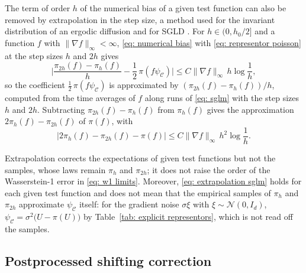\documentclass{article}
\newcommand{\Le}{\leqslant}
\newcommand{\norm}[1]{\lVert #1 \rVert}
\numberwithin{equation}{section}
\begin{document}
The term of order $h$ of the numerical bias of a given test function can also be removed by extrapolation in the step size, a method used for the invariant distribution of an ergodic diffusion \citep{lemaire2015invariant} and for SGLD \citep{durmus2016stochastic}. For $h \in (0, h_0/2]$ and a function $f$ with $\norm{\nabla f}_\infty < \infty$, \eqref{eq: numerical bias} with \eqref{eq: representor poisson} at the step sizes $h$ and $2h$ gives
\begin{equation}
    \biggl| \frac{\pi_{2h}(f) - \pi_h(f)}{h} - \frac12\, \pi(f \psi_{\mathcal C}) \biggr| \Le C \norm{\nabla f}_\infty\, h \log\frac1h ,
    \label{eq: extrapolation sglm}
\end{equation}
so the coefficient $\frac12\, \pi(f \psi_{\mathcal C})$ is approximated by $(\pi_{2h}(f) - \pi_h(f))/h$, computed from the time averages of $f$ along runs of \eqref{eq: sglm} with the step sizes $h$ and $2h$. Subtracting $\pi_{2h}(f) - \pi_h(f)$ from $\pi_h(f)$ gives the approximation $2\pi_h(f) - \pi_{2h}(f)$ of $\pi(f)$, with
\begin{equation}
    \bigl| 2\pi_h(f) - \pi_{2h}(f) - \pi(f) \bigr| \Le C \norm{\nabla f}_\infty\, h^2 \log\frac1h .
    \label{eq: extrapolation estimate}
\end{equation}

Extrapolation corrects the expectations of given test functions but not the samples, whose laws remain $\pi_h$ and $\pi_{2h}$; it does not raise the order of the Wasserstein-1 error in \eqref{eq: w1 limits}. Moreover, \eqref{eq: extrapolation sglm} holds for each given test function and does not mean that the empirical samples of $\pi_h$ and $\pi_{2h}$ approximate $\psi_{\mathcal C}$ itself: for the gradient noise $\sigma \xi$ with $\xi \sim \mathcal N(0, I_d)$, $\psi_{\mathcal C} = \sigma^2 \bigl( U - \pi(U) \bigr)$ by Table~\ref{tab: explicit representors}, which is not read off the samples.

\subsection{Postprocessed shifting correction}
\label{subsec: shifting}
\end{document}
